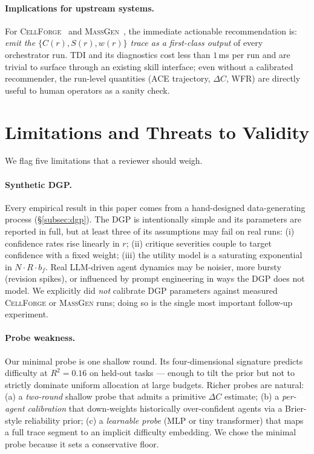 \documentclass[10pt,a4paper]{article}
\begin{document}
\paragraph{Implications for upstream systems.} For
\textsc{CellForge}~\citep{chen2025cellforge} and
\textsc{MassGen}~\citep{massgen2025github}, the immediate actionable
recommendation is: \emph{emit the $\{C(r), S(r), w(r)\}$ trace as a
first-class output} of every orchestrator run. TDI and its diagnostics cost
less than $1$\,ms per run and are trivial to surface through an existing
skill interface; even without a calibrated recommender, the run-level
quantities (ACE trajectory, $\Delta C$, WFR) are directly useful to human
operators as a sanity check.

\section{Limitations and Threats to Validity}\label{sec:limits}

We flag five limitations that a reviewer should weigh.

\paragraph{Synthetic DGP.} Every empirical result in this paper comes from a
hand-designed data-generating process (\S\ref{subsec:dgp}). The DGP is
intentionally simple and its parameters are reported in full, but at least
three of its assumptions may fail on real runs:
(i) confidence rates rise linearly in $r$;
(ii) critique severities couple to target confidence with a fixed weight;
(iii) the utility model is a saturating exponential in $N\!\cdot\!R\!\cdot\!b_f$.
Real LLM-driven agent dynamics may be noisier, more bursty (revision spikes),
or influenced by prompt engineering in ways the DGP does not model. We
explicitly did \emph{not} calibrate DGP parameters against measured
\textsc{CellForge} or \textsc{MassGen} runs; doing so is the single most
important follow-up experiment.

\paragraph{Probe weakness.} Our minimal probe is one shallow round. Its
four-dimensional signature predicts difficulty at $R^2\!=\!0.16$ on held-out
tasks --- enough to tilt the prior but not to strictly dominate uniform
allocation at large budgets. Richer probes are natural:
(a) a \emph{two-round} shallow probe that admits a primitive $\Delta C$
estimate; (b) a \emph{per-agent calibration} that down-weights historically
over-confident agents via a Brier-style reliability prior; (c) a
\emph{learnable probe} (MLP or tiny transformer) that maps a full trace
segment to an implicit difficulty embedding. We chose the minimal probe
because it sets a conservative floor.
\end{document}
